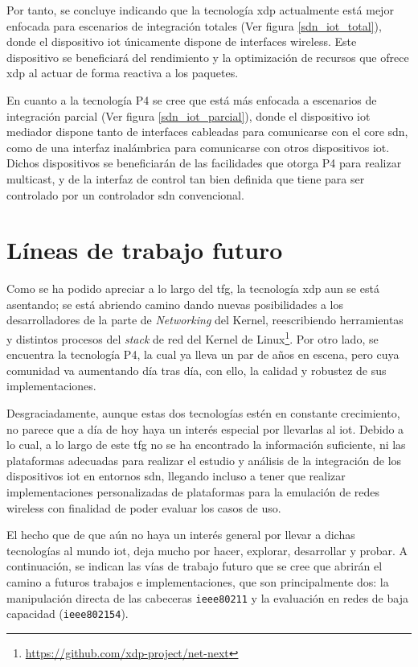 Por tanto, se concluye indicando que la tecnología \gls{xdp} actualmente está mejor enfocada para escenarios de integración totales (Ver figura \ref{sdn_iot_total}), donde el dispositivo \gls{iot} únicamente dispone de interfaces wireless. Este dispositivo se beneficiará del rendimiento y la optimización de recursos que ofrece \gls{xdp} al actuar de forma reactiva a los paquetes. \\
\par
En cuanto a la tecnología P4 se cree que está más enfocada a escenarios de integración parcial (Ver figura \ref{sdn_iot_parcial}), donde el dispositivo \gls{iot} mediador dispone tanto de interfaces cableadas para comunicarse con el core \gls{sdn}, como de una interfaz inalámbrica para comunicarse con otros dispositivos \gls{iot}. Dichos dispositivos se beneficiarán de las facilidades que otorga P4 para realizar multicast, y de la interfaz de control tan bien definida que tiene para ser controlado por un controlador \gls{sdn} convencional.
\vspace{2cm}




\newpage
\section{Líneas de trabajo futuro}
\label{trabajoFuturo}

Como se ha podido apreciar a lo largo del \gls{tfg}, la tecnología \gls{xdp} aun se está asentando; se está abriendo camino dando nuevas posibilidades a los desarrolladores de la parte de \textit{Networking} del Kernel, reescribiendo herramientas y distintos procesos del \textit{stack} de red del Kernel de Linux\footnote{\url{https://github.com/xdp-project/net-next}}. Por otro lado, se encuentra la tecnología P4, la cual ya lleva un par de años en escena, pero cuya comunidad va aumentando día tras día,  con ello, la calidad y robustez de sus implementaciones.   \\
\par
Desgraciadamente, aunque estas dos tecnologías estén en constante crecimiento, no parece que a día de hoy haya un interés especial por llevarlas al \gls{iot}. Debido a lo cual, a lo largo de este \gls{tfg} no se ha encontrado la información suficiente, ni las plataformas adecuadas para realizar el estudio y análisis de la integración de los dispositivos \gls{iot} en entornos \gls{sdn}, llegando incluso a tener que realizar implementaciones personalizadas de plataformas para la emulación de redes wireless con finalidad de poder evaluar los casos de uso. \\
\par
El hecho que de que aún no haya un interés general por llevar a dichas tecnologías al mundo \gls{iot}, deja mucho por hacer, explorar, desarrollar y probar. A continuación, se indican las vías de trabajo futuro que se cree que abrirán el camino a futuros trabajos e implementaciones, que son principalmente dos: la manipulación directa de las cabeceras \texttt{ieee80211} y la evaluación en redes de baja capacidad (\texttt{ieee802154}).

